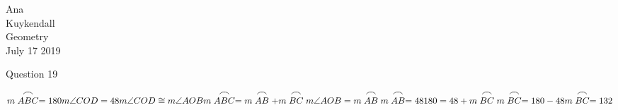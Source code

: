\documentclass[12pt]{article}
\newcommand{\tarc}{\mbox{\large$\frown$}}
\newcommand{\arc}[1]{\stackrel{\tarc}{#1}}
\begin{document}
\begin{flushleft}

Ana\\
Kuykendall\\
Geometry\\
July 17 2019\\


\begin{center}
Question 19
\end{center}


\setlength{\parindent}{0.5in}
\setlength{\parindent}{0.5in}


\begin{equation}
  m \arc{ABC} = 180 \\
  m \angle{COD} = 48 \\
  m \angle{COD} \cong m \angle{AOB} \\
  m \arc{ABC} = m \arc{AB} + m \arc{BC} \\
  m \angle{AOB} = m \arc{AB} \\
  m \arc{AB} = 48 \\
  180 = 48 + m \arc{BC} \\
  m \arc{BC} = 180 - 48 \\
  m \arc{BC} = 132 \\ 
\end{equation}




\end{flushleft}
\end{document}
